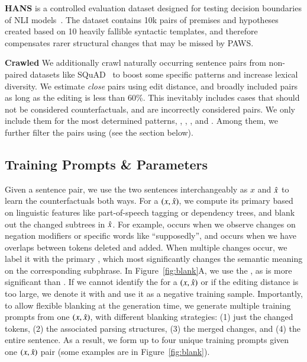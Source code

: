\textbf{HANS} is a controlled evaluation dataset designed for testing decision boundaries of NLI models~\cite{mccoy2019right}. 
The dataset contains 10k pairs of premises and hypotheses created based on 10 heavily fallible syntactic templates, and therefore compensates rarer structural changes that may be missed by PAWS.


\textbf{Crawled} 
We additionally crawl naturally occurring sentence pairs from non-paired datasets like SQuAD~\cite{rajpurkar-etal-2016-squad} to boost some specific patterns and increase lexical diversity. 
We estimate \emph{close} pairs using edit distance, and broadly included pairs as long as the editing is less than 60\%.
This inevitably includes cases that should not be considered counterfactuals,\eg {} and  are incorrectly considered  pairs. 
We only include them for the most determined patterns, \ie {}, , , and .
Among them, we further filter the pairs using \tagstrs (see the section below).


\subsection{Training Prompts \& Parameters}

Given a sentence pair, we use the two sentences interchangeably as $x$ and $\hat{x}$ to learn the counterfactuals both ways.
For a $(x, \hat{x})$, we compute its primary \tagstr based on linguistic features like part-of-speech tagging or dependency trees, and blank out the changed subtrees in $\hat{x}$.
For example,  occurs when we observe changes on negation modifiers or specific words like ``supposedly'', and  occurs when we have overlaps between tokens deleted and added.
When multiple changes occur, we label it with the primary \tagstr, which most significantly changes the semantic meaning on the corresponding subphrase.
In Figure~\ref{fig:blank}A, we use the \tagstrshort {}, as  is more significant than .
If we cannot identify the \tagstr for a $(x, \hat{x})$ or if the editing distance is too large, we denote it with  and use it as a negative training sample.
Importantly, to allow flexible blanking at the generation time, we generate multiple training prompts from one $(x, \hat{x})$, with different blanking strategies: (1) just the changed tokens, (2) the associated parsing structures, (3) the merged changes, and (4) the entire sentence.
As a result, we form up to four unique training prompts given one $(x, \hat{x})$ pair (some examples are in Figure~\ref{fig:blank}).

